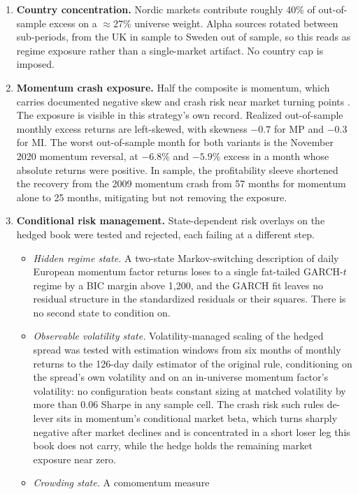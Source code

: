 \documentclass[11pt,a4paper]{article}
\begin{document}
\begin{enumerate}
  \item \textbf{Country concentration.} Nordic markets contribute roughly
  40\% of out-of-sample excess on a $\approx$27\% universe weight. Alpha
  sources rotated between sub-periods, from the UK in sample to Sweden out
  of sample, so this reads as regime exposure rather than a single-market
  artifact. No country cap is imposed.
  \item \textbf{Momentum crash exposure.} Half the composite is momentum,
  which carries documented negative skew and crash risk near market turning
  points \citep{daniel2016}. The exposure is visible in this strategy's own
  record. Realized out-of-sample monthly excess returns are left-skewed,
  with skewness $-0.7$ for MP and $-0.3$ for MI. The worst out-of-sample
  month for both variants is the November 2020 momentum reversal, at
  $-6.8\%$ and $-5.9\%$ excess in a month whose absolute returns were
  positive. In sample,
  the profitability sleeve shortened the recovery from the 2009 momentum
  crash from 57 months for momentum alone to 25 months, mitigating but not
  removing the exposure.
  \item \textbf{Conditional risk management.} State-dependent risk
  overlays on the hedged book were tested and rejected, each failing at
  a different step.
  \begin{itemize}
    \item \emph{Hidden regime state.} A two-state Markov-switching
    description of daily European momentum factor returns loses to a
    single fat-tailed GARCH-$t$ regime by a BIC margin above 1{,}200,
    and the GARCH fit leaves no residual structure in the standardized
    residuals or their squares. There is no second state to condition
    on.
    \item \emph{Observable volatility state.} Volatility-managed scaling
    of the hedged spread \citep{barroso2015} was tested with estimation
    windows from six months of monthly returns to the 126-day daily
    estimator of the original rule, conditioning on the spread's own
    volatility and on an in-universe momentum factor's volatility: no
    configuration beats constant sizing at matched volatility by more
    than 0.06 Sharpe in any sample cell. The crash risk such rules
    de-lever sits in momentum's conditional market beta, which turns
    sharply negative after market declines \citep{daniel2016} and is
    concentrated in a short loser leg this book does not carry, while
    the hedge holds the remaining market exposure near zero.
    \item \emph{Crowding state.} A comomentum measure

\end{itemize}
\end{enumerate}
\end{document}
